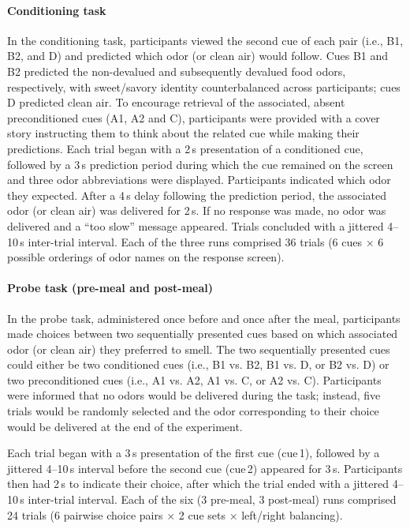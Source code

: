 \documentclass[9pt,twoside,lineno]{pnas-new}
\begin{document}
\paragraph*{Conditioning task}

In the conditioning task, participants viewed the second cue of each pair (i.e., B1, B2, and D) and predicted which odor (or clean air) would follow. Cues B1 and B2 predicted the non-devalued and subsequently devalued food odors, respectively, with sweet/savory identity counterbalanced across participants; cues D predicted clean air. To encourage retrieval of the associated, absent preconditioned cues (A1, A2 and C), participants were provided with a cover story instructing them to think about the related cue while making their predictions. Each trial began with a 2\,s presentation of a conditioned cue, followed by a 3\,s prediction period during which the cue remained on the screen and three odor abbreviations were displayed. Participants indicated which odor they expected. After a 4\,s delay following the prediction period, the associated odor (or clean air) was delivered for 2\,s. If no response was made, no odor was delivered and a “too slow” message appeared. Trials concluded with a jittered 4--10\,s inter-trial interval. Each of the three runs comprised 36 trials (6 cues $\times$ 6 possible orderings of odor names on the response screen).

\paragraph*{Probe task (pre-meal and post-meal)}

In the probe task, administered once before and once after the meal, participants made choices between two sequentially presented cues based on which associated odor (or clean air) they preferred to smell. The two sequentially presented cues could either be two conditioned cues (i.e., B1 vs. B2, B1 vs. D, or B2 vs. D) or two preconditioned cues (i.e., A1 vs. A2, A1 vs. C, or A2 vs. C). Participants were informed that no odors would be delivered during the task; instead, five trials would be randomly selected and the odor corresponding to their choice would be delivered at the end of the experiment.

Each trial began with a 3\,s presentation of the first cue (cue\,1), followed by a jittered 4--10\,s interval before the second cue (cue\,2) appeared for 3\,s. Participants then had 2\,s to indicate their choice, after which the trial ended with a jittered 4--10\,s inter-trial interval. Each of the six (3 pre-meal, 3 post-meal) runs comprised 24 trials (6 pairwise choice pairs $\times$ 2 cue sets $\times$ left/right balancing).
\end{document}
